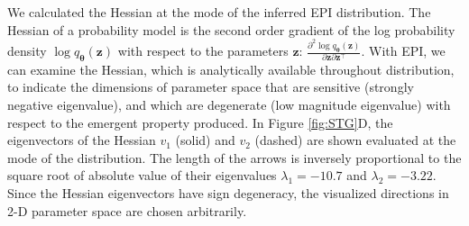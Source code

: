 \documentclass[11pt]{article}
\begin{document}
We calculated the Hessian at the mode of the inferred EPI distribution.  
The Hessian of a probability model is the second order gradient of the log probability density $\log q_{\bm{\theta}}(\mathbf{z})$ with respect to the parameters $\mathbf{z}$:  $\frac{\partial^2 \log q_{\bm{\theta}}(\mathbf{z})}{\partial \mathbf{z} \partial \mathbf{z}^\top}$.  
With EPI, we can examine the Hessian, which is analytically available throughout distribution, to indicate the dimensions of parameter space that are sensitive (strongly negative eigenvalue), and which are degenerate (low magnitude eigenvalue) with respect to the emergent property produced. 
In Figure \ref{fig:STG}D, the eigenvectors of the Hessian $v_1$ (solid) and $v_2$ (dashed) are shown evaluated at the mode of the distribution.  
The length of the arrows is inversely proportional to the square root of absolute value of their eigenvalues $\lambda_1 = -10.7$ and $\lambda_2 = -3.22$.
Since the Hessian eigenvectors have sign degeneracy, the visualized directions in 2-D parameter space are chosen arbitrarily.
\end{document}
